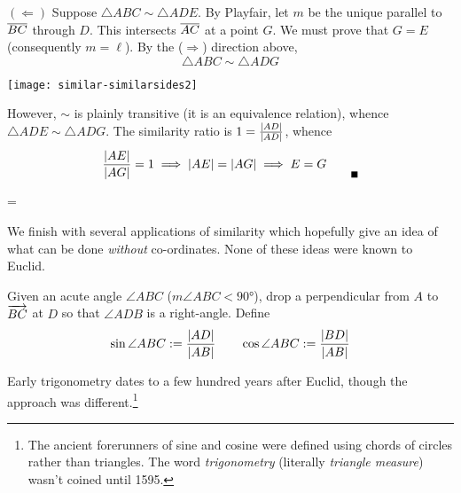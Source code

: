 \begin{tcolorbox}[proofstyle]
\begin{description}
		\begin{minipage}[t]{0.61\linewidth}\vspace{-3pt}
			\item[$(\Leftarrow)$] Suppose $\triangle ABC\sim\triangle ADE$. By Playfair, let $m$ be the unique parallel to $\overline{BC}$ through $D$. This intersects $\overline{AC}$ at a point $G$. We must prove that $G=E$ (consequently $m=\ell$).\smallbreak
			By the ($\Rightarrow$) direction above,
			\[
				\triangle ABC\sim\triangle ADG
			\]
		\end{minipage}
		\hfill
		\begin{minipage}[t]{0.38\linewidth}\vspace{-8pt}
			\flushright
			\texttt{[image: similar-similarsides2]}
		\end{minipage}\smallbreak
		However, $\sim$ is plainly transitive (it is an equivalence relation), whence $\triangle ADE\sim\triangle ADG$. The similarity ratio is $1=\frac{\left| AD\right|}{\left| AD\right|}$, whence
		\[
			\frac{\nm{AE}}{\nm{AG}}=1\implies \nm{AE}=\nm{AG} \implies E=G \tag*{\qedsymbol}
		\]
	\end{description}
\end{tcolorbox}

\skip{}\bigskipamount


\skip\footins=\bigskipamount

\goodbreak




We finish with several applications of similarity which hopefully give an idea of what can be done \emph{without} co-ordinates. None of these ideas were known to Euclid.

\begin{defn}{}{}
	Given an acute angle $\angle ABC$ ($m\angle ABC<\ang{90}$), drop a perpendicular from $A$ to $\overrightarrow{BC}$ at $D$ so that $\angle ADB$ is a right-angle. Define
	\[
		\sin\angle ABC:=\frac{\left| AD\right|}{\left| AB\right|}\qquad \cos\angle ABC:=\frac{\left| BD\right|}{\left| AB\right|}
	\]
\end{defn}

Early trigonometry dates to a few hundred years after Euclid, though the approach was different.\footnote{The ancient forerunners of sine and cosine were defined using chords of circles rather than triangles. The word \emph{trigonometry} (literally \emph{triangle measure}) wasn't coined until 1595.}


